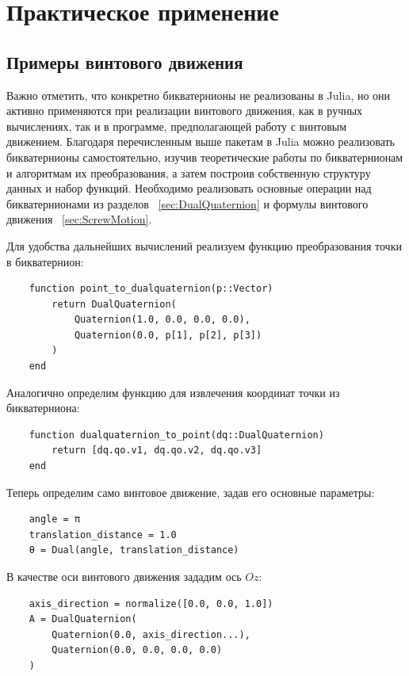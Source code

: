 \chapter{Практическое применение}

\section{Примеры винтового движения}

Важно отметить, что конкретно бикватернионы не реализованы в Julia, но они активно применяются при реализации винтового движения, как в ручных вычислениях, так и в программе, предполагающей работу с винтовым движением.
Благодаря перечисленным выше пакетам в Julia можно реализовать бикватернионы самостоятельно, изучив теоретические работы по бикватернионам и алгоритмам их преобразования, а затем построив собственную структуру данных и набор функций. Необходимо реализовать основные операции над бикватернионами из разделов ~\ref{sec:DualQuaternion} и формулы винтового движения ~\ref{sec:ScrewMotion}.

Для удобства дальнейших вычислений реализуем функцию преобразования точки в бикватернион:

\begin{verbatim}
    function point_to_dualquaternion(p::Vector)
        return DualQuaternion(
            Quaternion(1.0, 0.0, 0.0, 0.0),  
            Quaternion(0.0, p[1], p[2], p[3]) 
        )
    end
\end{verbatim}

Аналогично определим функцию для извлечения координат точки из бикватерниона:

\begin{verbatim}
    function dualquaternion_to_point(dq::DualQuaternion)
        return [dq.qo.v1, dq.qo.v2, dq.qo.v3]
    end
\end{verbatim}

Теперь определим само винтовое движение, задав его основные параметры:

\begin{verbatim}
    angle = π  
    translation_distance = 1.0  
    θ = Dual(angle, translation_distance)  
\end{verbatim}

В качестве оси винтового движения зададим ось $Oz$:

\begin{verbatim}
    axis_direction = normalize([0.0, 0.0, 1.0])
    A = DualQuaternion(
        Quaternion(0.0, axis_direction...), 
        Quaternion(0.0, 0.0, 0.0, 0.0)
    )
\end{verbatim}

